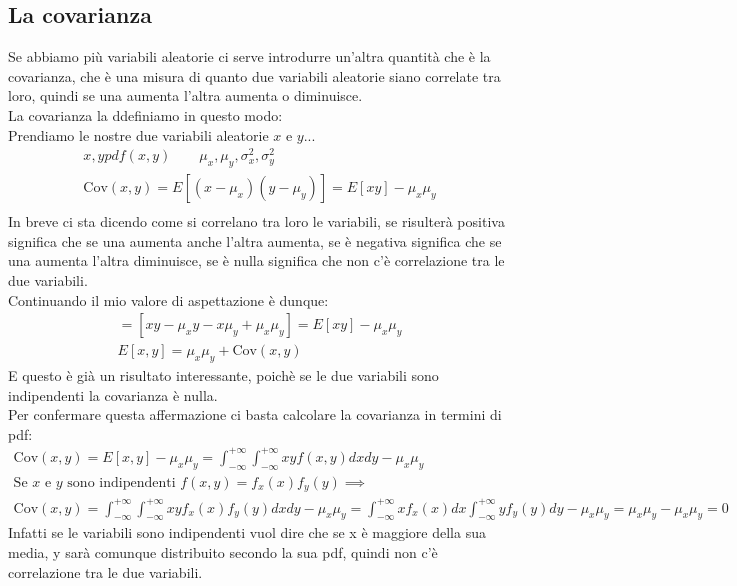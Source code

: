 \documentclass[a4paper, oneside]{article}
\begin{document}
\subsection{La covarianza}
Se abbiamo più variabili aleatorie ci serve introdurre un'altra quantità che è la covarianza, che è una misura di quanto due variabili aleatorie siano correlate tra loro, quindi se una aumenta l'altra aumenta o diminuisce.\\
La covarianza la ddefiniamo in questo modo:\\
Prendiamo le nostre due variabili aleatorie $x$ e $y$...
\begin{gather*}
    x, y pdf(x,y) \qquad \mu_x, \mu_y, \sigma^2_x, \sigma^2_y\\
    \text{Cov}(x,y) = E[(x - \mu_x)(y - \mu_y)] = E[xy] - \mu_x \mu_y\\
\end{gather*}
In breve ci sta dicendo come si correlano tra loro le variabili, se risulterà positiva significa che se una aumenta anche l'altra aumenta, se è negativa significa che se una aumenta l'altra diminuisce, se è nulla significa che non c'è correlazione tra le due variabili.\\
Continuando il mio valore di aspettazione è dunque:
\begin{gather*}
    = [xy - \mu_x y - x \mu_y + \mu_x \mu_y] = E[xy] - \mu_x \mu_y\\
    E[x,y] = \mu_x \mu_y + \text{Cov}(x,y)
\end{gather*}
E questo è già un risultato interessante, poichè se le due variabili sono indipendenti la covarianza è nulla.\\
Per confermare questa affermazione ci basta calcolare la covarianza in termini di pdf:
\begin{gather*}
    \text{Cov}(x,y) = E[x,y] -\mu_x \mu_y = \int_{-\infty}^{+\infty} \int_{-\infty}^{+\infty} xy f(x,y) dx dy - \mu_x \mu_y\\
    \text{Se } x \text{ e } y \text{ sono indipendenti } f(x,y) = f_x(x) f_y(y) \implies \\
    \text{Cov}(x,y) = \int_{-\infty}^{+\infty} \int_{-\infty}^{+\infty} xy f_x(x) f_y(y) dx dy - \mu_x \mu_y = \int_{-\infty}^{+\infty} x f_x(x) dx \int_{-\infty}^{+\infty} y f_y(y) dy - \mu_x \mu_y = \mu_x \mu_y - \mu_x \mu_y = 0
\end{gather*}
Infatti se le variabili sono indipendenti vuol dire che se x è maggiore della sua media, y sarà comunque distribuito secondo la sua pdf, quindi non c'è correlazione tra le due variabili.\\
\end{document}
